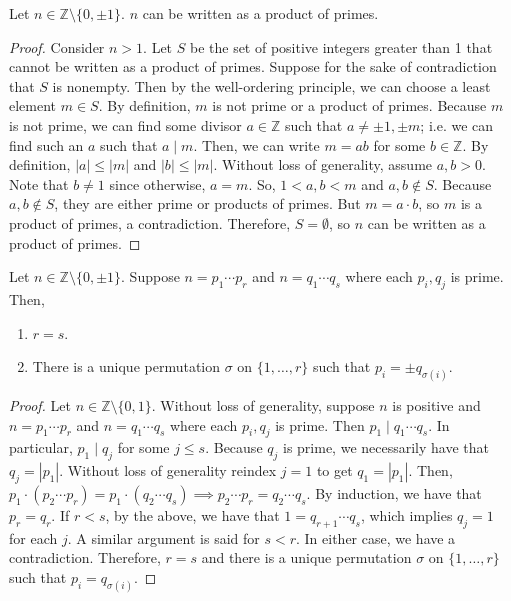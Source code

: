 \documentclass [12pt] {article}
\newcommand{\Z}{\mathbb{Z}}
\newenvironment{theorem}[1]{\begin{tcolorbox}[title={Theorem #1}]}{\end{tcolorbox}}
\begin{document}
\begin{theorem}{}
    Let $n \in \Z \setminus \{ 0, \pm 1 \}$. $n$ can be written as a product of primes.
\end{theorem}
\begin{proof}
    Consider $n > 1$. Let $S$ be the set of positive integers greater than 1 that cannot be written
    as a product of primes. Suppose for the sake of contradiction that $S$ is nonempty. Then by the
    well-ordering principle, we can choose a least element $m \in S$. By definition, $m$ is not
    prime or a product of primes. Because $m$ is not prime, we can find some divisor $a \in \Z$ such
    that $a \neq \pm 1, \pm m$; i.e. we can find such an $a$ such that $a \mid m$. Then, we can
    write $m = ab$ for some $b \in \Z$. By definition, $|a| \leq |m|$ and $|b| \leq |m|$. Without
    loss of generality, assume $a, b > 0$. Note that $b \neq 1$ since otherwise, $a = m$. So, 
    $1 < a, b < m$ and $a, b \not \in S$. Because $a, b \not \in S$, they are either prime or
    products of primes. But $m = a \cdot b$, so $m$ is a product of primes, a contradiction.
    Therefore, $S = \emptyset$, so $n$ can be written as a product of primes.
\end{proof}

\begin{theorem}{(Fundamental Theorem of Arithmetic}
    Let $n \in \Z \setminus \{ 0, \pm 1 \}$. Suppose $n = p_1 \cdots p_r$ and $n = q_1 \cdots q_s$
    where each $p_i, q_j$ is prime. Then,
    \begin{enumerate}[label=(\arabic*)]
        \item $r = s$.
        \item There is a unique permutation $\sigma$ on $\{ 1, \ldots, r \}$ such that 
            $p_i = \pm q_{\sigma(i)}$.
    \end{enumerate}
\end{theorem}
\begin{proof}
    Let $n \in \Z \setminus \{ 0, 1 \}$. Without loss of generality, suppose $n$ is positive and 
    $n = p_1 \cdots p_r$ and $n = q_1 \cdots q_s$ where each $p_i, q_j$ is prime. Then $p_1 \mid q_1
    \cdots q_s$. In particular, $p_1 \mid q_j$ for some $j \leq s$. Because $q_j$ is prime, we
    necessarily have that $q_j = |p_1|$. Without loss of generality reindex  $j = 1$ to get 
    $q_1 = |p_1|$. Then,
    $
    p_1 \cdot (p_2 \cdots p_r) = p_1 \cdot (q_2 \cdots q_s)
    \implies 
    p_2 \cdots p_r = q_2 \cdots q_s
    $. By induction, we have that $p_r = q_r$. If $r < s$, by the above, we have that 
    $1 = q_{r + 1} \cdots q_s$, which implies $q_j = 1$ for each $j$. A similar argument is said for
    $s < r$. In either case, we have a contradiction. Therefore, $r = s$ and there is a unique
    permutation $\sigma$ on $\{ 1, \ldots, r \}$ such that $p_i = q_{\sigma(i)}$.
\end{proof}
\end{document}
